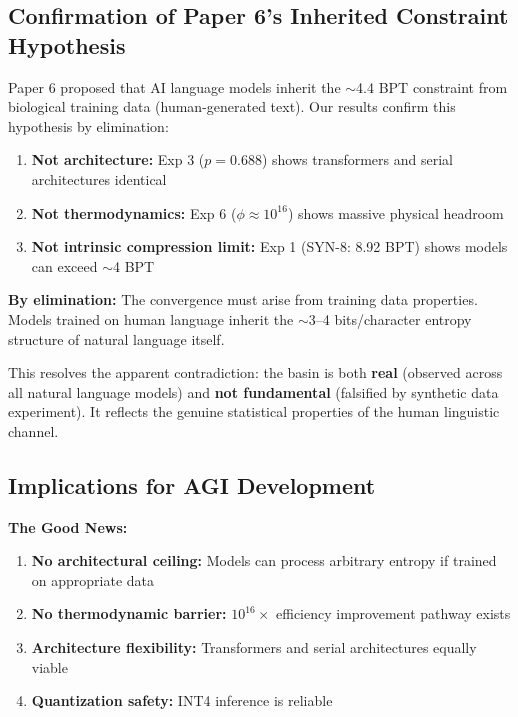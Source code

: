 \documentclass[11pt,a4paper]{article}
\begin{document}
\subsection{Confirmation of Paper 6's Inherited Constraint Hypothesis}

Paper 6 \cite{whitmer2025f} proposed that AI language models inherit the $\sim$4.4 BPT constraint from biological training data (human-generated text). Our results confirm this hypothesis by elimination:

\begin{enumerate}
\item \textbf{Not architecture:} Exp 3 ($p = 0.688$) shows transformers and serial architectures identical
\item \textbf{Not thermodynamics:} Exp 6 ($\phi \approx 10^{16}$) shows massive physical headroom
\item \textbf{Not intrinsic compression limit:} Exp 1 (SYN-8: 8.92 BPT) shows models can exceed $\sim$4 BPT
\end{enumerate}

\textbf{By elimination:} The convergence must arise from training data properties. Models trained on human language inherit the $\sim$3--4 bits/character entropy structure of natural language itself.

This resolves the apparent contradiction: the basin is both \textbf{real} (observed across all natural language models) and \textbf{not fundamental} (falsified by synthetic data experiment). It reflects the genuine statistical properties of the human linguistic channel.

\subsection{Implications for AGI Development}

\textbf{The Good News:}
\begin{enumerate}
\item \textbf{No architectural ceiling:} Models can process arbitrary entropy if trained on appropriate data
\item \textbf{No thermodynamic barrier:} $10^{16}\times$ efficiency improvement pathway exists
\item \textbf{Architecture flexibility:} Transformers and serial architectures equally viable
\item \textbf{Quantization safety:} INT4 inference is reliable
\end{enumerate}
\end{document}
